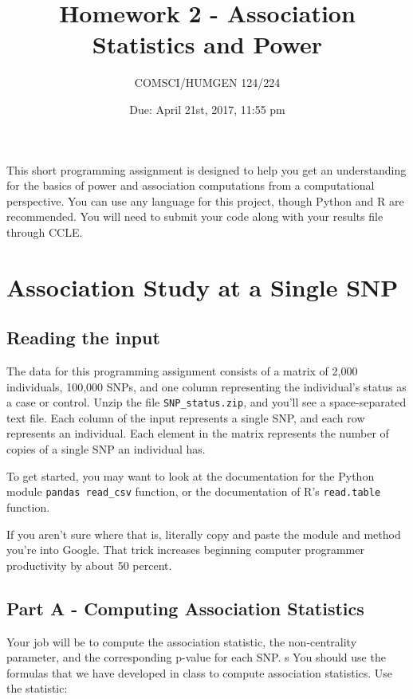 \documentclass{article}
\begin{document}
\title{Homework 2 - Association Statistics and Power}

\author{COMSCI/HUMGEN 124/224}

\date{Due: April 21st, 2017, 11:55 pm}

\maketitle

This short programming assignment is designed to help you get an
understanding for the basics of power and association computations
from a computational perspective. You can use any language
for this project, though Python and R are recommended. You will
need to submit your code along with your results file through CCLE.


\section*{Association Study at a Single SNP}

\subsection*{Reading the input}
The data for this programming assignment consists of a matrix
of 2,000 individuals, 100,000 SNPs, and one column representing
the individual's status as a case or control. Unzip the file \verb!SNP_status.zip!,
and you'll see a space-separated text file.
Each column of the input represents a single SNP, and each row
represents an individual. Each element in the matrix represents
the number of copies of a single SNP an individual has.

To get started, you may want to look at the documentation for
the Python module \verb!pandas read_csv! function,
or the documentation of R's \texttt{read.table} function.

If you aren't sure where that is, literally copy and paste
the module and method you're into Google. That trick
increases beginning computer 
programmer productivity by about 50 percent.


\subsection*{Part A - Computing Association Statistics}
Your job will be to compute the association statistic, the non-centrality
parameter, and the corresponding p-value for each SNP.
s
You should use the formulas that we have developed in
class to compute association statistics.  Use the statistic:
\end{document}
